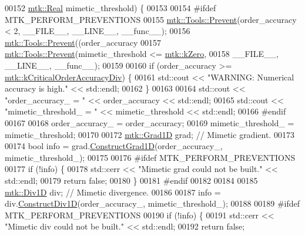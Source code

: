 \begin{DoxyCode}
00152                                 \hyperlink{group__c01-roots_gac080bbbf5cbb5502c9f00405f894857d}{mtk::Real} mimetic\_threshold) \{
00153 
00154 \textcolor{preprocessor}{  #ifdef MTK\_PERFORM\_PREVENTIONS}
00155   \hyperlink{classmtk_1_1Tools_a332324c6f25e66be9dff48c5987a3b9f}{mtk::Tools::Prevent}(order\_accuracy < 2, \_\_FILE\_\_, \_\_LINE\_\_, \_\_func\_\_);
00156   \hyperlink{classmtk_1_1Tools_a332324c6f25e66be9dff48c5987a3b9f}{mtk::Tools::Prevent}((order\_accuracy%
00157   \hyperlink{classmtk_1_1Tools_a332324c6f25e66be9dff48c5987a3b9f}{mtk::Tools::Prevent}(mimetic\_threshold <= \hyperlink{group__c01-roots_ga59a451a5fae30d59649bcda274fea271}{mtk::kZero},
00158                       \_\_FILE\_\_, \_\_LINE\_\_, \_\_func\_\_);
00159 
00160   \textcolor{keywordflow}{if} (order\_accuracy >= \hyperlink{group__c01-roots_ga0898eef2108473e44a5223932d571c31}{mtk::kCriticalOrderAccuracyDiv}) \{
00161     std::cout << \textcolor{stringliteral}{"WARNING: Numerical accuracy is high."} << std::endl;
00162   \}
00163 
00164   std::cout << \textcolor{stringliteral}{"order\_accuracy\_ = "} << order\_accuracy << std::endl;
00165   std::cout << \textcolor{stringliteral}{"mimetic\_threshold\_ = "} << mimetic\_threshold << std::endl;
00166 \textcolor{preprocessor}{  #endif}
00167 
00168   order\_accuracy\_ = order\_accuracy;
00169   mimetic\_threshold\_ = mimetic\_threshold;
00170 
00172   \hyperlink{classmtk_1_1Grad1D}{mtk::Grad1D} grad; \textcolor{comment}{// Mimetic gradient.}
00173 
00174   \textcolor{keywordtype}{bool} info = grad.\hyperlink{classmtk_1_1Grad1D_a74ef5245cfae6fd158bd7f563a0c2e52}{ConstructGrad1D}(order\_accuracy\_, mimetic\_threshold\_);
00175 
00176 \textcolor{preprocessor}{  #ifdef MTK\_PERFORM\_PREVENTIONS}
00177   \textcolor{keywordflow}{if} (!info) \{
00178     std::cerr << \textcolor{stringliteral}{"Mimetic grad could not be built."} << std::endl;
00179     \textcolor{keywordflow}{return} \textcolor{keyword}{false};
00180   \}
00181 \textcolor{preprocessor}{  #endif}
00182 
00184 
00185   \hyperlink{classmtk_1_1Div1D}{mtk::Div1D} div; \textcolor{comment}{// Mimetic divergence.}
00186 
00187   info = div.\hyperlink{classmtk_1_1Div1D_a52fcd1542f11e606e36bd188e48bfdf7}{ConstructDiv1D}(order\_accuracy\_, mimetic\_threshold\_);
00188 
00189 \textcolor{preprocessor}{  #ifdef MTK\_PERFORM\_PREVENTIONS}
00190   \textcolor{keywordflow}{if} (!info) \{
00191     std::cerr << \textcolor{stringliteral}{"Mimetic div could not be built."} << std::endl;
00192     \textcolor{keywordflow}{return} \textcolor{keyword}{false};

\end{DoxyCode}
